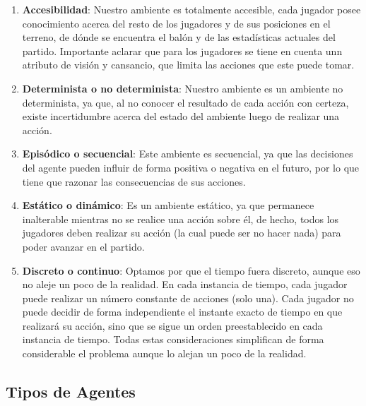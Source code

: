\documentclass{article}
\begin{document}
\begin{enumerate}
      \item \textbf{Accesibilidad}: Nuestro ambiente es totalmente accesible, cada jugador posee conocimiento acerca del
            resto de los jugadores y de sus posiciones en el terreno, de dónde se encuentra el balón y de las estadísticas 
            actuales del partido. Importante aclarar que para los jugadores se tiene en cuenta unn atributo de visión y 
            cansancio, que limita las acciones que este puede tomar.
            
      \item \textbf{Determinista o no determinista}: Nuestro ambiente es un ambiente no determinista, ya que, al no
            conocer el resultado de cada acción con certeza, existe incertidumbre acerca del estado del ambiente luego de 
            realizar una acción.
            
      \item \textbf{Episódico o secuencial}: Este ambiente es secuencial, ya que las decisiones del agente pueden
            influir de forma positiva o negativa en el futuro, por lo que tiene que razonar las consecuencias de sus acciones.
            
      \item \textbf{Estático o dinámico}: Es un ambiente estático, ya que permanece inalterable mientras no se
            realice una acción sobre él, de hecho, todos los jugadores deben realizar su acción (la cual puede ser no hacer 
            nada) para poder avanzar en el partido.
            
      \item \textbf{Discreto o continuo}: Optamos por que el tiempo fuera discreto, aunque eso no aleje un poco de la
            realidad. En cada instancia de tiempo, cada jugador puede realizar un número constante de acciones (solo una). 
            Cada jugador no puede decidir de forma independiente el instante exacto de tiempo en que realizará su acción, 
            sino que se sigue un orden preestablecido en cada instancia de tiempo. Todas estas consideraciones simplifican 
            de forma considerable el problema aunque lo alejan un poco de la realidad.
            
\end{enumerate}

\subsection{Tipos de Agentes}
\end{document}
